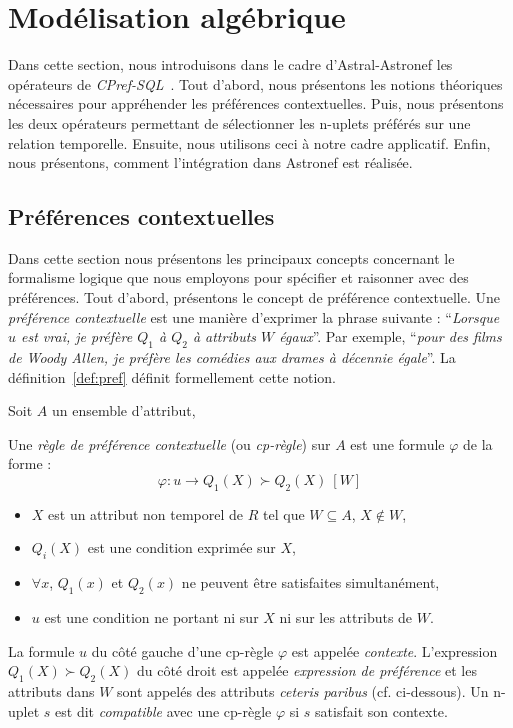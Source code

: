\section{Modélisation algébrique}\label{sec:ext:prefs:algebre}
Dans cette section, nous introduisons dans le cadre d'Astral-Astronef les opérateurs de \textit{CPref-SQL}~\cite{DeAmo:cprefsql}. Tout d'abord, nous présentons les notions théoriques nécessaires pour appréhender les préférences contextuelles. Puis, nous présentons les deux opérateurs permettant de sélectionner les n-uplets préférés sur une relation temporelle. Ensuite, nous utilisons ceci à notre cadre applicatif. Enfin, nous présentons, comment l'intégration dans Astronef est réalisée.

\subsection{Préférences contextuelles}
Dans cette section nous présentons les principaux concepts concernant le formalisme logique que nous employons pour spécifier et raisonner avec des préférences. Tout d'abord, présentons le concept de préférence contextuelle. Une \textit{préférence contextuelle} est une manière d'exprimer la phrase suivante : \enquote{\it Lorsque $u$ est vrai, je préfère $Q_1$ à $Q_2$ à attributs $W$ égaux}. Par exemple, \enquote{\it pour des films de Woody Allen, je préfère les comédies aux drames à décennie égale}. La définition~\ref{def:pref} définit formellement cette notion.

\begin{defi}\label{def:pref}
Soit $A$ un ensemble d'attribut,

Une \textit{règle de préférence contextuelle} (ou \textit{cp-règle}) sur $A$ est une formule $\varphi$ de la forme :
 $$\varphi: u \rightarrow Q_1(X) \succ Q_2(X)\ [W]$$
\begin{itemize}
	\item $X$ est un attribut non temporel de $R$ tel que $W \subseteq A$, $X \not \in W$,
	\item $Q_i(X)$ est une condition exprimée sur $X$,
	\item $\forall x$, $Q_1(x)$ et $Q_2(x)$ ne peuvent être satisfaites simultanément,
	\item $u$ est une condition ne portant ni sur $X$ ni sur les attributs de $W$.
	\end{itemize}
\end{defi}

La formule $u$ du côté gauche d'une cp-règle $\varphi$ est appelée \textit{contexte}. L'expression $Q_1(X) \succ Q_2(X)$ du côté droit est appelée \textit{expression de préférence} et les attributs dans $W$ sont appelés des attributs \textit{ceteris paribus} (cf. ci-dessous). Un n-uplet $s$ est dit \textit{compatible} avec une cp-règle $\varphi$ si $s$ satisfait son contexte.

